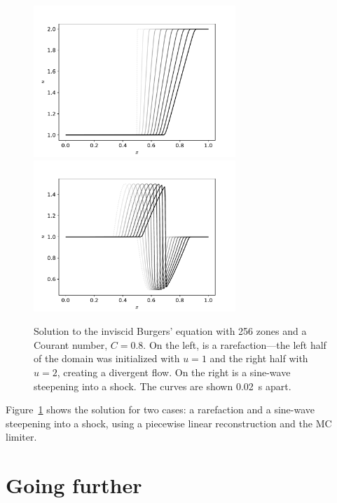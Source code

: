 \begin{figure}[t]
\centering
\includegraphics[width=3.0in]{fv-burger-rarefaction}
\includegraphics[width=3.0in]{fv-burger-sine}
\caption[Solutions to the inviscid Burgers'
  equation.]{\label{fig:burgers} Solution to the inviscid Burgers'
  equation with 256 zones and a Courant number, $C = 0.8$.  On the
  left, is a rarefaction---the left half of the domain was initialized
  with $u = 1$ and the right half with $u = 2$, creating a divergent
  flow.  On the right is a sine-wave steepening into a shock.  The
  curves are shown 0.02~s apart.}
\end{figure}

Figure~\ref{fig:burgers} shows the solution for two cases: a rarefaction
and a sine-wave steepening into a shock, using a piecewise linear
reconstruction and the MC limiter.


\section{Going further}
